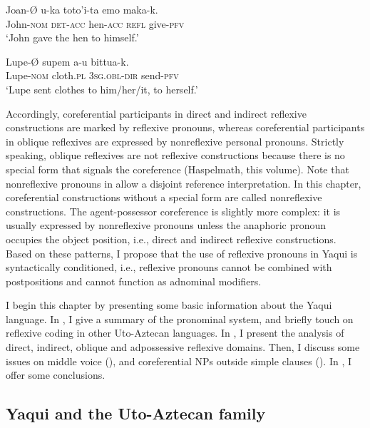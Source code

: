 \documentclass[output=paper]{langscibook}
\begin{document}
\ex
\label{ex:guerrero:1b}
\gll Joan-Ø   u-ka  toto’i-ta   emo   maka-k.\\
John-\textsc{nom} \textsc{det-acc}    hen\textsc{{}-acc} \textsc{refl}  give-\textsc{pfv}\\
\glt ‘John gave the hen to himself.’

\ex
\label{ex:guerrero:1c}
\gll Lupe-Ø   supem   a-u  bittua-k.\\
Lupe-\textsc{nom}  cloth\textsc{.pl}     \textsc{3sg.obl-dir}   send-\textsc{pfv}\\
\glt ‘Lupe sent clothes to him/her/it, to herself.’
\z
\z


Accordingly, coreferential participants in direct  and indirect  reflexive constructions are marked by reflexive pronouns, whereas coreferential participants in oblique reflexives  are expressed by nonreflexive personal pronouns. Strictly speaking, oblique reflexives are not reflexive constructions because there is no special form that signals the coreference (Haspelmath, this volume). Note that nonreflexive pronouns in  allow a disjoint reference interpretation. In this chapter, coreferential constructions without a special form are called nonreflexive constructions. The agent-possessor coreference is slightly more complex: it is usually expressed by nonreflexive pronouns unless the anaphoric pronoun occupies the object position, i.e., direct and indirect reflexive constructions. Based on these patterns, I propose that the use of reflexive pronouns in Yaqui is syntactically conditioned, i.e., reflexive pronouns cannot be combined with postpositions and cannot function as adnominal modifiers.



I begin this chapter by presenting some basic information about the Yaqui language. In , I give a summary of the pronominal system, and briefly touch on reflexive coding in other Uto-Aztecan languages. In , I present the analysis of direct, indirect, oblique and adpossessive reflexive domains. Then, I discuss some issues on middle voice (), and coreferential NPs outside simple clauses (). In , I offer some conclusions.



\subsection{Yaqui and the Uto-Aztecan family}\label{sec:guerrero:1.1.}
\end{document}
